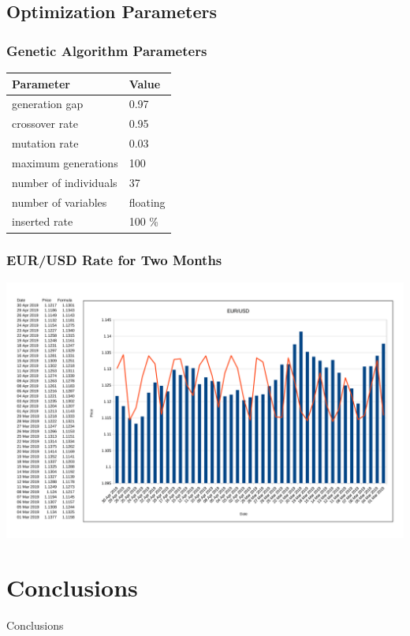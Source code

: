 \documentclass{beamer}
\begin{document}
\subsection{Optimization Parameters}

\begin{frame}
\frametitle{Genetic Algorithm Parameters}
\begin{table}
	\begin{tabular}{p{5.4cm}p{4.4cm}}
		\hline
		\textbf{Parameter} & \textbf{Value} \\
		\hline
		generation gap & 0.97 \\
		crossover rate & 0.95 \\
		mutation rate & 0.03 \\
		maximum generations & 100 \\
		number of individuals & 37 \\
		number of variables & floating \\
		inserted rate & 100 \% \\
		\hline
	\end{tabular}
\end{table}
\end{frame}

\begin{frame}
\frametitle{EUR/USD Rate for Two Months}
\includegraphics[scale=0.09]{fig01.png}
\end{frame}

\section{Conclusions}

\begin{frame}
\center \huge{Conclusions}
\end{frame}
\end{document}
